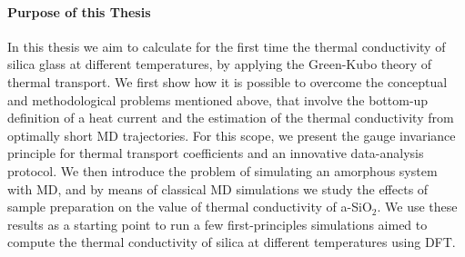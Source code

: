 \medskip

\paragraph{Purpose of this Thesis}
In this thesis we aim to calculate for the first time the thermal conductivity of silica glass at different temperatures, by applying the \abinitio Green-Kubo theory of thermal transport. 
We first show how it is possible to overcome the conceptual and methodological problems mentioned above, that involve the bottom-up definition of a heat current and the estimation of the thermal conductivity from optimally short MD trajectories. 
For this scope, we present the gauge invariance principle for thermal transport coefficients and an innovative data-analysis protocol. 
We then introduce the problem of simulating an amorphous system with MD, and by means of classical MD simulations we study the effects of sample preparation on the value of thermal conductivity of a-SiO$_2$. 
We use these results as a starting point to run a few first-principles simulations aimed to compute the thermal conductivity of silica at different temperatures using DFT. 



